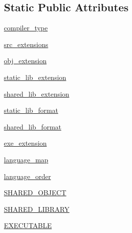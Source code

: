 \subsection*{Static Public Attributes}
\begin{DoxyCompactItemize}
\item 
\hyperlink{classsetuptools_1_1__distutils_1_1ccompiler_1_1CCompiler_aa444121e77aedf440d7d9ff5b24d566e}{compiler\+\_\+type}
\item 
\hyperlink{classsetuptools_1_1__distutils_1_1ccompiler_1_1CCompiler_ae15beaf30b5da1fb897f15ed2be092ee}{src\+\_\+extensions}
\item 
\hyperlink{classsetuptools_1_1__distutils_1_1ccompiler_1_1CCompiler_a8f45af0d93b938009c4cc48fdf71842c}{obj\+\_\+extension}
\item 
\hyperlink{classsetuptools_1_1__distutils_1_1ccompiler_1_1CCompiler_a873c8d08fe04d38ce76b85305bf23a94}{static\+\_\+lib\+\_\+extension}
\item 
\hyperlink{classsetuptools_1_1__distutils_1_1ccompiler_1_1CCompiler_a4b2284ba74dd975e9d283a6386fba5c0}{shared\+\_\+lib\+\_\+extension}
\item 
\hyperlink{classsetuptools_1_1__distutils_1_1ccompiler_1_1CCompiler_a095da839d53153373c5e155a10358c58}{static\+\_\+lib\+\_\+format}
\item 
\hyperlink{classsetuptools_1_1__distutils_1_1ccompiler_1_1CCompiler_a367bc65dce854fe081788509d893a744}{shared\+\_\+lib\+\_\+format}
\item 
\hyperlink{classsetuptools_1_1__distutils_1_1ccompiler_1_1CCompiler_a1fd28fd0cce946e8c86e6c6b9aa25520}{exe\+\_\+extension}
\item 
\hyperlink{classsetuptools_1_1__distutils_1_1ccompiler_1_1CCompiler_af9faaccc17bb928c4d6671ae311bb83c}{language\+\_\+map}
\item 
\hyperlink{classsetuptools_1_1__distutils_1_1ccompiler_1_1CCompiler_a9baf83c68167697ea6a445a7cd97e8a4}{language\+\_\+order}
\item 
\hyperlink{classsetuptools_1_1__distutils_1_1ccompiler_1_1CCompiler_a1ddbe722d374f6bf8e4aa510a9b74326}{S\+H\+A\+R\+E\+D\+\_\+\+O\+B\+J\+E\+CT}
\item 
\hyperlink{classsetuptools_1_1__distutils_1_1ccompiler_1_1CCompiler_ae758dd3a5c848d4e4bd381849361757a}{S\+H\+A\+R\+E\+D\+\_\+\+L\+I\+B\+R\+A\+RY}
\item 
\hyperlink{classsetuptools_1_1__distutils_1_1ccompiler_1_1CCompiler_a1e7f73dcea0af2a1c987e8724dde295a}{E\+X\+E\+C\+U\+T\+A\+B\+LE}
\end{DoxyCompactItemize}


